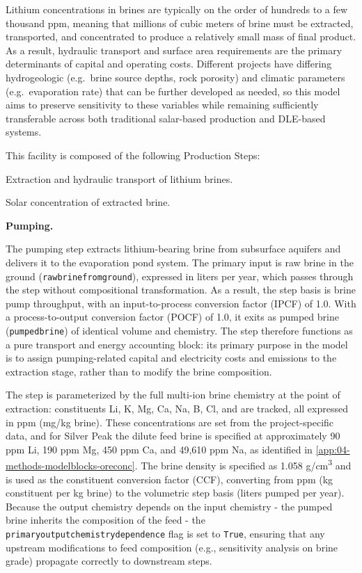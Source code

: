 \documentclass{article}
\renewcommand\_{\textunderscore\allowbreak}
\begin{document}
Lithium concentrations in brines are typically on the order of hundreds to a few thousand ppm, meaning that millions of cubic meters of brine must be extracted, transported, and concentrated to produce a relatively small mass of final product. As a result, hydraulic transport and surface area requirements are the primary determinants of capital and operating costs. Different projects have differing hydrogeologic (e.g.\ brine source depths, rock porosity) and climatic parameters (e.g.\ evaporation rate) that can be further developed as needed, so this model aims to preserve sensitivity to these variables while remaining sufficiently transferable across both traditional salar-based production and DLE-based systems.

This facility is composed of the following Production Steps:

\begin{description}[noitemsep, topsep=0pt]
    \item[\textbullet\enskip\texttt{Pumping:}] Extraction and hydraulic transport of lithium brines. 
    \item[\textbullet\enskip\texttt{Evaporation:}] Solar concentration of extracted brine.
\end{description}

\medskip
\noindent\textbf{Pumping.}\quad

The pumping step extracts lithium-bearing brine from subsurface aquifers and delivers it to the evaporation pond system. The primary input is raw brine in the ground (\texttt{raw\_brine\_from\_ground}), expressed in liters per year, which passes through the step without compositional transformation. As a result, the step basis is brine pump throughput, with an input-to-process conversion factor (IPCF) of 1.0. With a process-to-output conversion factor (POCF) of 1.0, it exits as pumped brine (\texttt{pumped\_brine}) of identical volume and chemistry. The step therefore functions as a pure transport and energy accounting block: its primary purpose in the model is to assign pumping-related capital and electricity costs and emissions to the extraction stage, rather than to modify the brine composition.

The step is parameterized by the full multi-ion brine chemistry at the point of extraction: constituents Li, K, Mg, Ca, Na, B, Cl, and  are tracked, all expressed in ppm (mg/kg brine). These concentrations are set from the project-specific data, and for Silver Peak the dilute feed brine is specified at approximately 90 ppm Li, 190 ppm Mg, 450 ppm Ca, and 49,610 ppm Na, as identified in \ref{app:04-methods-modelblocks-oreconc}. The brine density is specified as 1.058 \si{g/cm^3} and is used as the constituent conversion factor (CCF), converting from ppm (kg constituent per kg brine) to the volumetric step basis (liters pumped per year). Because the output chemistry depends on the input chemistry - the pumped brine inherits the composition of the feed - the \texttt{primary\_output\_1\_chemistry\_dependence} flag is set to \texttt{True}, ensuring that any upstream modifications to feed composition (e.g., sensitivity analysis on brine grade) propagate correctly to downstream steps.
\end{document}

